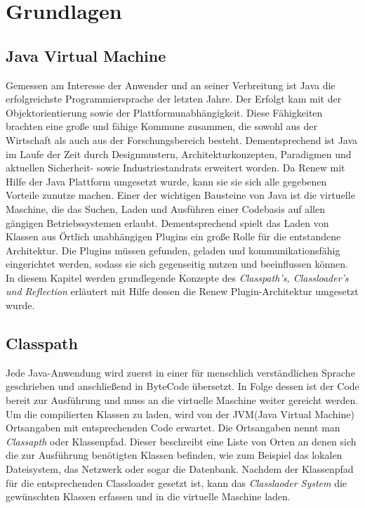 \chapter{Grundlagen} 
\label{cha:Grundlagen}


\section{Java Virtual Machine} \label{sec:Java Virtual Machine}
  Gemessen am Interesse der Anwender und an seiner Verbreitung ist Java die erfolgreichste Programmiersprache der letzten Jahre. Der Erfolgt kam mit der Objektorientierung sowie der Plattformunabhängigkeit. 
  Diese Fähigkeiten brachten eine große und fähige Kommune zusammen, die sowohl aus der Wirtschaft als auch aus der Forschungsbereich besteht. 
  Dementsprechend ist Java im Laufe der Zeit durch Designmustern, Architekturkonzepten, Paradigmen und aktuellen Sicherheit- sowie Industriestandrats erweitert worden. 
  Da Renew mit Hilfe der Java Plattform umgesetzt wurde, kann sie sie sich alle gegebenen Vorteile zunutze machen. 
  Einer der wichtigen Bausteine von Java ist die virtuelle Maschine, die das Suchen, Laden und Ausführen einer Codebasis auf allen gängigen Betriebssystemen erlaubt. 
  Dementsprechend spielt das Laden von Klassen aus Örtlich unabhängigen Plugins ein große Rolle für die entstandene Architektur. 
  Die Plugins müssen gefunden, geladen und kommunikationsfähig eingerichtet werden, sodass sie sich gegenseitig nutzen und beeinflussen können. 
  \newline In diesem Kapitel werden grundlegende Konzepte des \textit{ Classpath's, Classloader's und Reflection} erläutert mit Hilfe dessen die Renew Plugin-Architektur umgesetzt wurde.
\section{Classpath}\label{sub:Classpath}
  Jede Java-Anwendung wird zuerst in einer für menschlich verständlichen Sprache geschrieben und anschließend in ByteCode übersetzt. 
  In Folge dessen ist der Code bereit zur Ausführung und muss an die virtuelle Maschine weiter gereicht werden.
  \newline Um die compilierten Klassen zu laden, wird von der JVM(Java Virtual Machine) Ortsangaben mit entsprechenden Code erwartet. 
  Die Ortsangaben nennt man \textit{Classapth} oder Klassenpfad. 
  Dieser beschreibt eine Liste von Orten an denen sich die zur Ausführung benötigten Klassen befinden, wie zum Beispiel das lokalen Dateisystem, das Netzwerk oder sogar die Datenbank. 
  Nachdem der Klassenpfad für die entsprechenden Classloader gesetzt ist, kann das \textit{Classlaoder System} die gewünschten Klassen erfassen und in die virtuelle Maschine laden.

